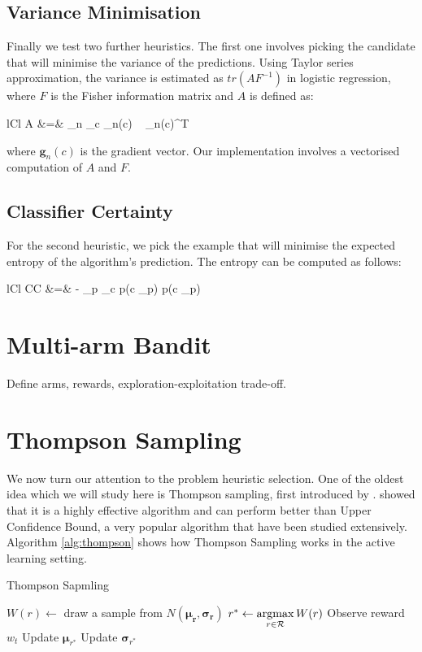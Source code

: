 \subsection{Variance Minimisation}
Finally we test two further heuristics. The first one involves picking the candidate that will minimise the variance of the predictions. Using Taylor series approximation, the variance is estimated as $tr(AF^{-1})$ in logistic regression, where $F$ is the Fisher information matrix and $A$ is defined as:
	\begin{IEEEeqnarray*}{lCl}
		A &=& \sum_n \sum_c _n(c) ~ _n(c)^T
	\end{IEEEeqnarray*}
where $\mathbf{g}_n(c)$ is the gradient vector. Our implementation involves a vectorised computation of $A$ and $F$.


\subsection{Classifier Certainty}
For the second heuristic, we pick the example that will minimise the expected entropy of the algorithm's prediction. The entropy can be computed as follows:
	\begin{IEEEeqnarray*}{lCl}
		CC &=& - \sum_{p \in {}} \sum_c p(c \mid {}_p) \log p(c \mid {}_p)
	\end{IEEEeqnarray*}
	


\section{Multi-arm Bandit}
Define arms, rewards, exploration-exploitation trade-off.

\section{Thompson Sampling}
We now turn our attention to the problem heuristic selection.
 One of the oldest idea which we will
study here is Thompson sampling, first introduced by .
 showed that it is a highly effective algorithm and can perform better
than Upper Confidence Bound, a very popular algorithm that have been studied extensively.
Algorithm \ref{alg:thompson} shows how Thompson Sampling works in the active learning
setting.

\begin{algorithm}[tbp]
	\caption{Thompson Sapmling}
	\label{alg:thompson}
	\begin{algorithmic}[1]
				\State $W(r) \leftarrow$ draw a sample from $N(\bm{\mu_r}, \bm{\sigma_r})$
			\Endforeach
			\State $r^* \leftarrow \argmax_{r \in \R} W(r)$
			\State Observe reward $w_t$
			\State Update $\bm{\mu}_{r^*}$
			\State Update $\bm{\sigma}_{r^*}$
		\Endforeach
		\EndProcedure
	\end{algorithmic}
\end{algorithm}

